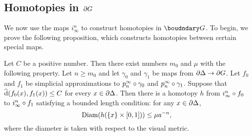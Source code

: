 \documentclass[a4paper]{article}
\begin{document}
\subsection{Homotopies in $\partial G$}

We now use the maps $i^n_\infty$ to construct homotopies in $\boudndary G$. To
begin, we prove the following proposition, which constructs homotopies between
certain special maps.

\begin{proposition}\label{prop:basic_homotopies}
  Let $C$ be a positive number. Then there exist numbers $m_0$ and $\mu$
  with the following property. Let $n \geq m_0$ and let $\gamma_0$ and
  $\gamma_1$ be maps from $\partial\Delta\to\partial G$. Let $f_0$ and $f_1$
  be simplicial approximations to $p^\infty_n\circ \gamma_0$ and
  $p^\infty_n\circ\gamma_1$. Suppose that $\operatorname{\widehat{d}}(f_0(x), f_1(x))\leq C$
  for every $x \in \partial \Delta$. Then there is a homotopy $h$ from
  $i^n_\infty\circ f_0$ to $i^n_\infty\circ f_1$ satisfying a bounded
  length condition: for any $x \in \partial\Delta$,
  \begin{equation*}
    \operatorname{Diam}(h(\{x\} \times [0,1])) \leq \mu a^{-n},
  \end{equation*}
  where the diameter is taken with respect to the visual metric.
\end{proposition}
\end{document}
